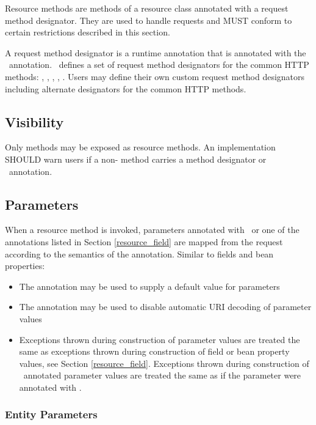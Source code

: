 Resource methods are methods of a resource class annotated with a request method designator. They are used to handle requests and MUST conform to certain restrictions described in this section.

A request method designator is a runtime annotation that is annotated with the \HttpMethod\ annotation. \jaxrs\ defines a set of request method designators for the common HTTP methods: , , , , . Users may define their own custom request method designators including alternate designators for the common HTTP methods.

\subsection{Visibility}

Only  methods may be exposed as resource methods. An implementation SHOULD warn users if a non- method carries a method designator or \Path\ annotation.

\subsection{Parameters}
\label{resource_method_params}

When a resource method is invoked, parameters annotated with \FormParam\ or one of the  annotations listed in Section \ref{resource_field} are mapped from the request according to the semantics of the annotation. Similar to fields and bean properties:
\begin{itemize}
\item The  annotation may be used to supply a default value for parameters
\item The  annotation may be used to disable automatic URI decoding of parameter values
\item Exceptions thrown during construction of parameter values are treated the same as exceptions thrown during construction of field or bean property values, see Section \ref{resource_field}. Exceptions thrown during construction of \FormParam\ annotated parameter values are treated the same as if the parameter were annotated with \HeaderParam.
\end{itemize}

\subsubsection{Entity Parameters}
\label{entity_parameters}


